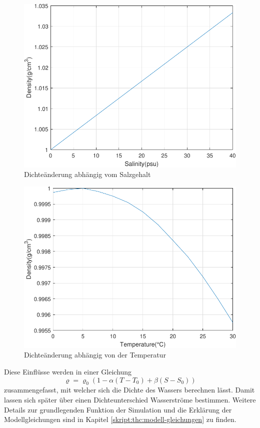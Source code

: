 \begin{figure}
	\centering
\includegraphics[width=12cm]{thermohalin/Code/graphs/graph_salinity.pdf}
\caption{Dichteänderung abhängig vom Salzgehalt\label{thermohalin:graph-salinity}}
\end{figure}
\begin{figure}
	\centering
	\includegraphics[width=12cm]{thermohalin/Code/graphs/graph_temp.pdf}
	\caption{Dichteänderung abhängig von der Temperatur\label{thermohalin:graph-temp}}
\end{figure}

Diese Einflüsse werden in einer Gleichung  
 \begin{equation}
 \varrho
 =
 \varrho_0(1-\alpha(T-T_0)+\beta(S-S_0))
 \label{thermohalin:Dichte}
 \end{equation} 
zusammengefasst, mit welcher sich die Dichte des Wassers berechnen lässt.
Damit lassen sich später über einen Dichteunterschied Wasserströme bestimmen.
Weitere Details zur grundlegenden Funktion der Simulation und die Erklärung der Modellgleichungen sind in Kapitel \ref{skript:thc:modell-gleichungen} zu finden.

